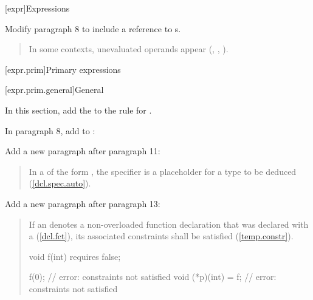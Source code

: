 

\setcounter{chapter}{4}
[expr]{Expressions}

Modify paragraph 8 to include a reference to s.

\begin{quote}
\pnum
In some contexts, unevaluated operands appear
(\added{\ref{expr.prim.req}, }, , 
).
\end{quote}

[expr.prim]{Primary expressions}

[expr.prim.general]{General}

In this section, add the
 to the rule for 
.

\begin{quote}
\begin{bnf}
\br
\end{bnf}
\end{quote}

In paragraph 8, add  to :

\begin{quote}
\setcounter{Paras}{7}
\pnum
\begin{bnf}
\br
     \terminal{::}
\end{bnf}
\end{quote}

Add a new paragraph after paragraph 11:

\begin{quote}
\setcounter{Paras}{11}
\pnum
In a  of the form , 
the  specifier is a placeholder for a type to be deduced
(\ref{dcl.spec.auto}).
\end{quote}

Add a new paragraph after paragraph 13:

\begin{quote}
\setcounter{Paras}{13}
\pnum
If an  denotes a non-overloaded function 
declaration that was declared with a 
(\ref{dcl.fct}), its associated constraints shall be satisfied
(\ref{temp.constr}).
\enterexample
\begin{codeblock}
void f(int) requires false;

f(0);               // error: constraints not satisfied
void (*p)(int) = f; // error: constraints not satisfied
\end{codeblock}
\exitexample
\end{quote}

